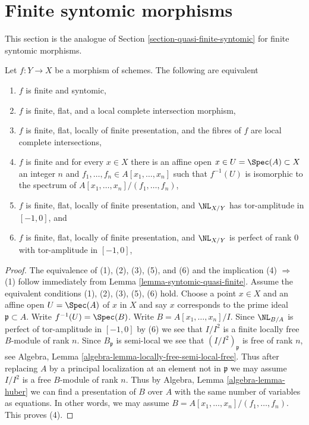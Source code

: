 \section{Finite syntomic morphisms}
\label{section-finite-syntomic}

\noindent
This section is the analogue of Section \ref{section-quasi-finite-syntomic}
for finite syntomic morphisms.

\begin{lemma}
\label{lemma-syntomic-finite}
Let $f : Y \to X$ be a morphism of schemes. The following are equivalent
\begin{enumerate}
\item $f$ is finite and syntomic,
\item $f$ is finite, flat, and a local complete intersection morphism,
\item $f$ is finite, flat, locally of finite presentation,
and the fibres of $f$ are local complete intersections,
\item $f$ is finite and for every $x \in X$ there is an
affine open $x \in U = \Spec(A) \subset X$ an integer $n$
and $f_1, \ldots, f_n \in A[x_1, \ldots, x_n]$ such that
$f^{-1}(U)$ is isomorphic to the spectrum of
$A[x_1, \ldots, x_n]/(f_1, \ldots, f_n)$,
\item $f$ is finite, flat, locally of finite presentation,
and $\NL_{X/Y}$ has tor-amplitude in $[-1, 0]$, and
\item $f$ is finite, flat, locally of finite presentation, and
$\NL_{X/Y}$ is perfect of rank $0$ with tor-amplitude in $[-1, 0]$,
\end{enumerate}
\end{lemma}

\begin{proof}
The equivalence of (1), (2), (3), (5), and (6)
and the implication (4) $\Rightarrow$ (1) follow immediately
from Lemma \ref{lemma-syntomic-quasi-finite}. Assume the equivalent conditions
(1), (2), (3), (5), (6) hold.
Choose a point $x \in X$ and an affine open $U = \Spec(A)$
of $x$ in $X$ and say $x$ corresponds to the prime ideal
$\mathfrak p \subset A$. Write $f^{-1}(U) = \Spec(B)$.
Write $B = A[x_1, \ldots, x_n]/I$. Since $\NL_{B/A}$
is perfect of tor-amplitude in $[-1, 0]$ by (6)
we see that $I/I^2$ is a finite locally free $B$-module
of rank $n$. Since $B_\mathfrak p$ is semi-local we see that
$(I/I^2)_\mathfrak p$ is free of rank $n$, see
Algebra, Lemma \ref{algebra-lemma-locally-free-semi-local-free}.
Thus after replacing $A$ by a principal localization at
an element not in $\mathfrak p$ we may assume $I/I^2$
is a free $B$-module of rank $n$.
Thus by Algebra, Lemma \ref{algebra-lemma-huber}
we can find a presentation of $B$ over $A$
with the same number of variables as equations. In other words,
we may assume $B = A[x_1, \ldots, x_n]/(f_1, \ldots, f_n)$.
This proves (4).
\end{proof}

